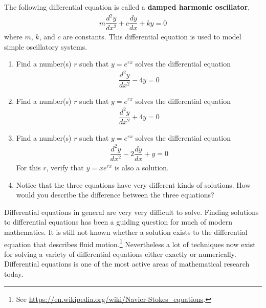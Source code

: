 \newpage
\begin{exercise}
  The following differential equation is called a {\bf damped harmonic oscillator},
  \begin{align*}
    m \dfrac{d^2y}{dx^2} + c \dfrac{dy}{dx} + k y = 0
  \end{align*}
  where $m$, $k$, and $c$ are constants.
  This differential equation is used to model simple oscillatory systems.
  \begin{enumerate}
    \item Find a number(s) $r$ such that $y=e^{rx}$ solves the differential equation
    \begin{align*}
       \dfrac{d^2y}{dx^2} - 4 y = 0
    \end{align*}
    \item Find a number(s) $r$ such that $y=e^{rx}$ solves the differential equation
    \begin{align*}
       \dfrac{d^2y}{dx^2} + 4 y = 0
    \end{align*}
    \item Find a number(s) $r$ such that $y=e^{rx}$ solves the differential equation
    \begin{align*}
       \dfrac{d^2y}{dx^2} - 2 \dfrac{dy}{dx} + y = 0
    \end{align*}
    For this $r$, verify that $y = x e^{rx}$ is also a solution.
    \item Notice that the three equations have very different kinds of solutions.
    How would you describe the difference between the three equations?
  \end{enumerate}
\end{exercise}

Differential equations in general are very very difficult to solve. Finding solutions to differential equations has been a guiding question for much of modern mathematics. It is still not known whether a solution exists to the differential equation that describes fluid motion.\footnote{See \url{https://en.wikipedia.org/wiki/Navier-Stokes_equations}.} Nevertheless a lot of techniques now exist for solving a variety of differential equations either exactly or numerically.
Differential equations is one of the most active areas of mathematical research today.
